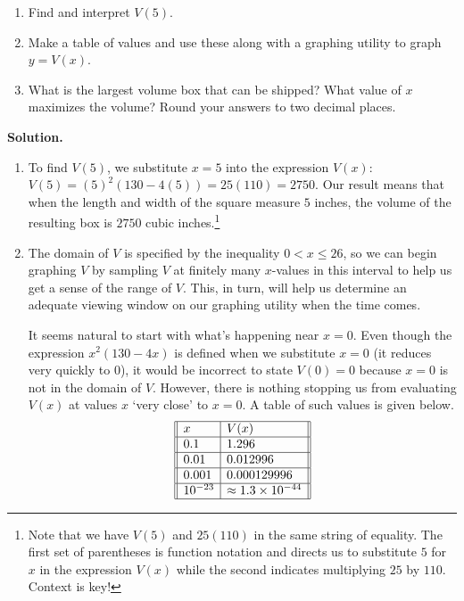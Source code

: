 \documentclass{ximera}
\begin{document}
\begin{example}
\begin{enumerate}
\item  Find and interpret $V(5)$.

\item  Make a table of values and use these along with a graphing utility to graph $y = V(x)$.

\item  What is the largest volume box that can be shipped?  What value of $x$ maximizes the volume?  Round your answers to two decimal places.

\end{enumerate}
{\bf Solution.}

\begin{enumerate}

\item To find $V(5)$, we substitute $x=5$ into the expression $V(x)$:  $V(5) = (5)^2 (130-4(5)) = 25(110) = 2750$.   Our result means that when the length and width of the square  measure $5$ inches, the volume of the resulting box is $2750$ cubic inches.\footnote{Note that we have $V(5)$ and $25(110)$ in the same string of equality. The first set of parentheses is function notation and directs us to substitute $5$ for $x$ in the expression $V(x)$ while the second indicates multiplying $25$ by $110$. Context is key!}

\item The domain of $V$ is specified by the inequality  $0 < x \leq 26$, so we can begin graphing $V$ by sampling  $V$ at finitely many $x$-values in this interval to help us get a sense of the range of $V$. This, in turn, will help us determine an adequate viewing window on our graphing utility when the time comes.

It seems natural to start with what's happening near $x = 0$.  Even though the expression $x^2 (130-4x)$  is defined when we substitute $x = 0$ (it reduces very quickly to $0$), it would be incorrect to state $V(0) = 0$ because $x = 0$ is not in the domain of $V$.  However,  there is nothing stopping us from evaluating $V(x)$ at values $x$ `very close' to $x = 0$.  A table of such values is given below. \[ \begin{array}{||l|l||} \hline 
        x & V(x) \\ \hline
      0.1 & 1.296 \\ \hline
     0.01 & 0.012996 \\ \hline
    0.001 & 0.000129996 \\ \hline
10^{-23} & \approx 1.3 \times 10^{-44} \\ \hline


\end{array}\]
\end{enumerate}
\end{example}
\end{document}
